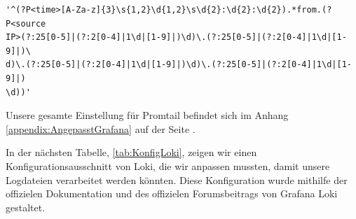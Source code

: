 {
\begin{Verbatim}[frame=single]
'^(?P<time>[A-Za-z]{3}\s{1,2}\d{1,2}\s\d{2}:\d{2}:\d{2}).*from.(?P<source
IP>(?:25[0-5]|(?:2[0-4]|1\d|[1-9]|)\d)\.(?:25[0-5]|(?:2[0-4]|1\d|[1-9]|)\
d)\.(?:25[0-5]|(?:2[0-4]|1\d|[1-9]|)\d)\.(?:25[0-5]|(?:2[0-4]|1\d|[1-9]|)
\d))'
\end{Verbatim}
\label{lst:ReGex_ExtractLabel}
}

Unsere gesamte Einstellung für Promtail befindet sich im Anhang \ref{appendix:AngepasstGrafana} auf der Seite \pageref{appendix:AngepasstGrafana}.

In der nächsten Tabelle, \ref{tab:KonfigLoki}, zeigen wir einen Konfigurationsausschnitt von Loki, die wir anpassen mussten, damit unsere Logdateien verarbeitet werden könnten. Diese Konfiguration wurde mithilfe der offizielen Dokumentation \citep{Grafana_ConfigLoki} und des offizielen Forumsbeitrags von Grafana Loki \citep{githubforum} gestaltet.

